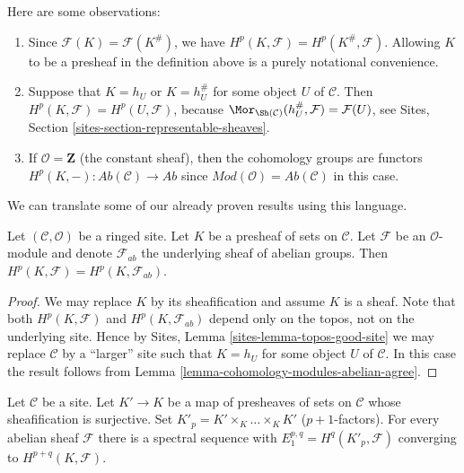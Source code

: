 \medskip\noindent
Here are some observations:
\begin{enumerate}
\item Since $\mathcal{F}(K) = \mathcal{F}(K^\#)$, we have
$H^p(K, \mathcal{F}) = H^p(K^\#, \mathcal{F})$.
Allowing $K$ to be a presheaf in the definition above is
a purely notational convenience.
\item Suppose that $K = h_U$ or $K = h_U^\#$ for some object $U$
of $\mathcal{C}$. Then $H^p(K, \mathcal{F}) = H^p(U, \mathcal{F})$, because
$\Mor_{\Sh(\mathcal{C})}(h_U^\#, \mathcal{F}) = \mathcal{F}(U)$, see
Sites, Section \ref{sites-section-representable-sheaves}.
\item If $\mathcal{O} = \mathbf{Z}$ (the constant sheaf), then
the cohomology groups are functors
$H^p(K, - ) : \textit{Ab}(\mathcal{C}) \to \textit{Ab}$
since $\textit{Mod}(\mathcal{O}) = \textit{Ab}(\mathcal{C})$ in this case.
\end{enumerate}
We can translate some of our already proven results using this language.

\begin{lemma}
\label{lemma-compute-cohomology-on-sheaf-sets}
Let $(\mathcal{C}, \mathcal{O})$ be a ringed site.
Let $K$ be a presheaf of sets on $\mathcal{C}$.
Let $\mathcal{F}$ be an $\mathcal{O}$-module and denote
$\mathcal{F}_{ab}$ the underlying sheaf of abelian groups.
Then $H^p(K, \mathcal{F}) = H^p(K, \mathcal{F}_{ab})$.
\end{lemma}

\begin{proof}
We may replace $K$ by its sheafification and assume $K$ is a sheaf.
Note that both $H^p(K, \mathcal{F})$ and $H^p(K, \mathcal{F}_{ab})$
depend only on the topos, not on the underlying site. Hence by
Sites, Lemma \ref{sites-lemma-topos-good-site}
we may replace $\mathcal{C}$ by a ``larger'' site such
that $K = h_U$ for some object $U$ of $\mathcal{C}$.
In this case the result follows from
Lemma \ref{lemma-cohomology-modules-abelian-agree}.
\end{proof}

\begin{lemma}
\label{lemma-cech-to-cohomology-sheaf-sets}
Let $\mathcal{C}$ be a site. Let $K' \to K$ be a map of presheaves
of sets on $\mathcal{C}$ whose sheafification is surjective. Set
$K'_p = K' \times_K \ldots \times_K K'$ ($p + 1$-factors).
For every abelian sheaf $\mathcal{F}$ there is a spectral sequence
with $E_1^{p, q} = H^q(K'_p, \mathcal{F})$ converging to
$H^{p + q}(K, \mathcal{F})$.
\end{lemma}

